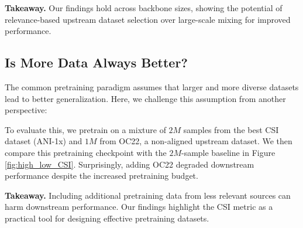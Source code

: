 \textbf{Takeaway.} Our findings hold across backbone sizes, showing the potential of relevance-based upstream dataset selection over large-scale mixing for improved performance.





\subsection{Is More Data Always Better?}
The common pretraining paradigm assumes that larger and more diverse datasets lead to better generalization. Here, we challenge this assumption from another perspective:


To evaluate this, we pretrain on a mixture of \(2M\) samples from the best CSI dataset (ANI-1x) and \(1M\) from OC22, a non-aligned upstream dataset. We then compare this pretraining checkpoint with the \(2M\)-sample baseline in Figure \ref{fig:high_low_CSI}. Surprisingly, adding OC22 degraded downstream performance despite the increased pretraining budget. 

\textbf{Takeaway.} Including additional pretraining data from less relevant sources can harm downstream performance. Our findings highlight the CSI metric as a practical tool for designing effective pretraining datasets.





%


